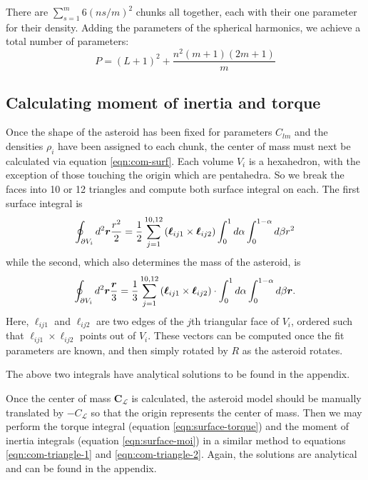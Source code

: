 \documentclass[aps,twocolumn,secnumarabic,balancelastpage,amsmath,amssymb,nofootinbib,floatfix]{revtex4-1}
\begin{document}
There are $\sum_{s=1}^m 6(ns/m)^2$ chunks all together, each with their one parameter for their density. Adding the parameters of the spherical harmonics, we achieve a total number of parameters:
\begin{equation}
    P = (L+1)^2 + \frac{n^2(m+1)(2m+1)}{m}
    \label{eqn:num-parameters}
\end{equation}


\subsection{Calculating moment of inertia and torque}
Once the shape of the asteroid has been fixed for parameters $C_{lm}$ and the densities $\rho_i$ have been assigned to each chunk, the center of mass must next be calculated via equation \ref{eqn:com-surf}. Each volume $V_i$ is a hexahedron, with the exception of those touching the origin which are pentahedra. So we break the faces into 10 or 12 triangles and compute both surface integral on each. The first surface integral is
\begin{equation}
    \oint_{\partial V_i} d^2 \bm r \frac{r^2}{2} =
    \frac{1}{2}\sum_{j=1}^{10, 12} \left( \bm \ell_{ij1}\times\bm \ell_{ij2} \right)\int_0^1 d\alpha \int_0^{1-\alpha} d\beta r^2
    \label{eqn:com-triangle-1}
\end{equation}
while the second, which also determines the mass of the asteroid, is 
\begin{equation}
    \oint_{\partial V_i} d^2 \bm r \frac{\bm r}{3} =
    \frac{1}{3}\sum_{j=1}^{10, 12} \left( \bm \ell_{ij1}\times\bm \ell_{ij2} \right)\cdot \int_0^1 d\alpha \int_0^{1-\alpha} d\beta \bm r.
    \label{eqn:com-triangle-2}
\end{equation}
Here, $\bm \ell_{ij1}$ and $\bm \ell_{ij2}$ are two edges of the $j$th triangular face of $V_i$, ordered such that $\bm \ell_{ij1} \times \bm \ell_{ij2}$ points out of $V_i$. These vectors can be computed once the fit parameters are known, and then simply rotated by $R$ as the asteroid rotates.

The above two integrals have analytical solutions to be found in the appendix.

Once the center of mass $\bm C_{\mathcal L}$ is calculated, the asteroid model should be manually translated by $\bm -C_{\mathcal L}$ so that the origin represents the center of mass. Then we may perform the torque integral (equation \ref{eqn:surface-torque}) and the moment of inertia integrals (equation \ref{eqn:surface-moi}) in a similar method to equations \ref{eqn:com-triangle-1} and \ref{eqn:com-triangle-2}. Again, the solutions are analytical and can be found in the appendix.
\end{document}
